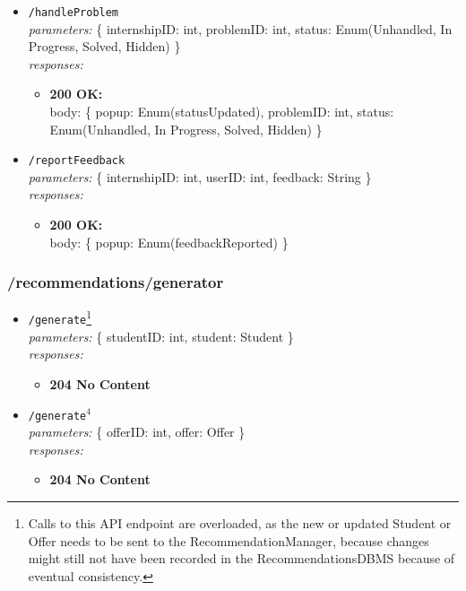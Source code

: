 \begin{itemize}
    \item \texttt{/handleProblem} \\
        \textit{parameters:} \{ internshipID: int, problemID: int, status: Enum(Unhandled, In Progress, Solved, Hidden) \} \\
        \textit{responses:}
        \begin{itemize}
            \item \textbf{200 OK:} \\
            body: \{ popup: Enum(statusUpdated), problemID: int, status: Enum(Unhandled, In Progress, Solved, Hidden) \}
        \end{itemize}
    \item \texttt{/reportFeedback} \\
        \textit{parameters:} \{ internshipID: int, userID: int, feedback: String \} \\
        \textit{responses:}
        \begin{itemize}
        \item \textbf{200 OK:} \\
            body: \{ popup: Enum(feedbackReported) \}
        \end{itemize}
\end{itemize}

\newpage

\subsubsection*{/recommendations/generator}
\begin{itemize}
    \item \texttt{/generate}\footnote{Calls to this API endpoint are overloaded, as the new or updated Student or Offer needs to be sent to the RecommendationManager, because changes might still not have been recorded in the RecommendationsDBMS because of eventual consistency.} \\
        \textit{parameters:} \{ studentID: int, student: Student \} \\
        \textit{responses:}
        \begin{itemize}
            \item \textbf{204 No Content}
        \end{itemize}
    \item \texttt{/generate}$^4$ \\
        \textit{parameters:} \{ offerID: int, offer: Offer \} \\
        \textit{responses:}
        \begin{itemize}
            \item \textbf{204 No Content}
        \end{itemize}
\end{itemize}

